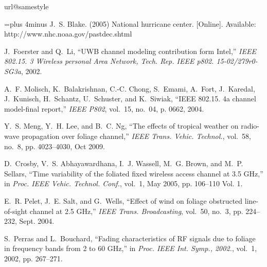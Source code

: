 \documentclass[conference]{IEEEtran}
\begin{document}
\begin{thebibliography}{10}
\providecommand{\url}[1]{#1}
\csname url@samestyle\endcsname
\providecommand{\newblock}{\relax}
\providecommand{\bibinfo}[2]{#2}
\providecommand{\BIBentrySTDinterwordspacing}{\spaceskip=0pt\relax}
\providecommand{\BIBentryALTinterwordstretchfactor}{4}
\providecommand{\BIBentryALTinterwordspacing}{\spaceskip=\fontdimen2\font plus
\BIBentryALTinterwordstretchfactor\fontdimen3\font minus
  \fontdimen4\font\relax}
\providecommand{\BIBforeignlanguage}[2]{{%
\expandafter\ifx\csname l@#1\endcsname\relax
\typeout{** WARNING: IEEEtran.bst: No hyphenation pattern has been}%
\typeout{** loaded for the language `#1'. Using the pattern for}%
\typeout{** the default language instead.}%
\else
\language=\csname l@#1\endcsname
\fi
#2}}
\providecommand{\BIBdecl}{\relax}
\BIBdecl

\BIBentryALTinterwordspacing
J.~{S. Blake}. (2005) National hurricane center. [Online]. Available:
  \url{http://www.nhc.noaa.gov/pastdec.shtml}
\BIBentrySTDinterwordspacing

J.~Foerster and Q.~Li, ``{UWB} channel modeling contribution form {Intel},''
  \emph{IEEE 802.15. 3 Wireless personal Area Network, Tech. Rep. IEEE p802.
  15-02/279r0-SG3a}, 2002.

A.~F. Molisch, K.~Balakrishnan, C.-C. Chong, S.~Emami, A.~Fort, J.~Karedal,
  J.~Kunisch, H.~Schantz, U.~Schuster, and K.~Siwiak, ``{IEEE} 802.15. 4a
  channel model-final report,'' \emph{IEEE P802}, vol.~15, no.~04, p. 0662,
  2004.

Y.~S. Meng, Y.~H. Lee, and B.~C. Ng, ``The effects of tropical weather on
  radio-wave propagation over foliage channel,'' \emph{IEEE Trans. Vehic.
  Technol.}, vol.~58, no.~8, pp. 4023--4030, Oct 2009.

D.~Crosby, V.~S. Abhayawardhana, I.~J. Wassell, M.~G. Brown, and M.~P. Sellars,
  ``Time variability of the foliated fixed wireless access channel at 3.5
  {GHz},'' in \emph{Proc. IEEE Vehic. Technol. Conf.}, vol.~1, May 2005, pp.
  106--110 Vol. 1.

E.~R. Pelet, J.~E. Salt, and G.~Wells, ``Effect of wind on foliage obstructed
  line-of-sight channel at 2.5 {GHz},'' \emph{IEEE Trans. Broadcasting},
  vol.~50, no.~3, pp. 224--232, Sept. 2004.

S.~Perras and L.~Bouchard, ``Fading characteristics of {RF} signals due to
  foliage in frequency bands from 2 to 60 {GHz},'' in \emph{{Proc. IEEE Int.
  Symp.}, 2002.}, vol.~1, 2002, pp. 267--271.


\end{thebibliography}
\end{document}
